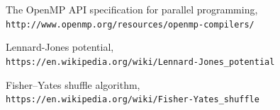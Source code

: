 \documentclass[a4paper,11pt]{article}
\begin{document}
\newpage

\begin{thebibliography}{9}

The OpenMP API specification for parallel programming,
\\\texttt{http://www.openmp.org/resources/openmp-compilers/}

Lennard-Jones potential,
\\\texttt{https://en.wikipedia.org/wiki/Lennard-Jones\_potential}

Fisher–Yates shuffle algorithm,
\\\texttt{https://en.wikipedia.org/wiki/Fisher-Yates\_shuffle}

\end{thebibliography}
\end{document}
